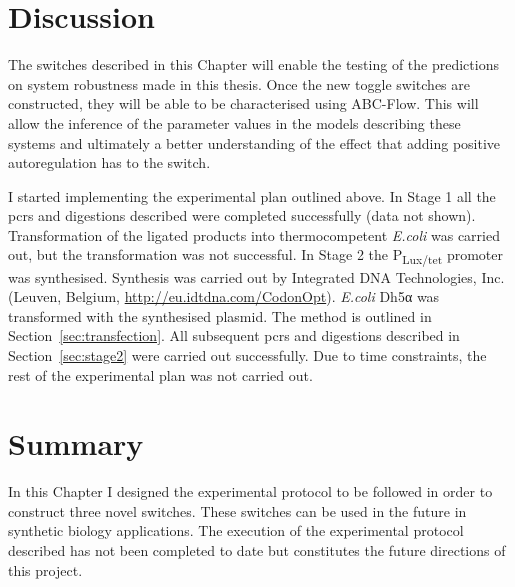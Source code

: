 
\clearpage
\section{Discussion}
The switches described in this Chapter will enable the testing of the predictions on system robustness made in this thesis. Once the new toggle switches are constructed, they will be able to be characterised using ABC-Flow. This will allow the inference of the parameter values in the models describing these systems and ultimately a better understanding of the effect that adding positive autoregulation has to the switch. 

I started implementing the experimental plan outlined above. In Stage 1 all the \acrshort{pcr}s and digestions described were completed successfully (data not shown). Transformation of the ligated products into thermocompetent \textit{E.coli} was carried out, but the transformation was not successful. In Stage 2 the P\textsubscript{Lux/tet} promoter was synthesised. Synthesis was carried out by Integrated DNA Technologies, Inc. (Leuven, Belgium, \url{http://eu.idtdna.com/CodonOpt}). \textit{E.coli} Dh5α was transformed with the synthesised plasmid. The method is outlined in Section~\ref{sec:transfection}. All subsequent \acrshort{pcr}s and digestions described in Section~\ref{sec:stage2} were carried out successfully. Due to time constraints, the rest of the experimental plan was not carried out.



\section{Summary}

In this Chapter I designed the experimental protocol to be followed in order to construct three novel switches. These switches can be used in the future in synthetic biology applications. The execution of the experimental protocol described has not been completed to date but constitutes the future directions of this project.

